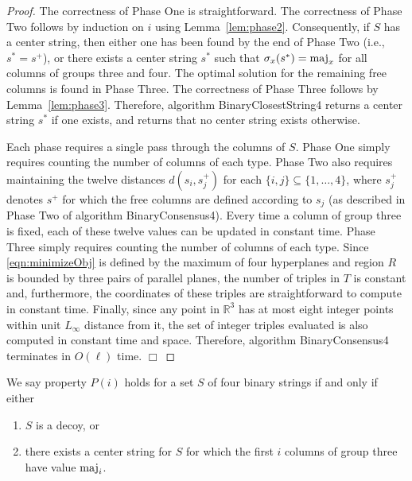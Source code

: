 \begin{proof}
The correctness of Phase One is straightforward.
The correctness of Phase Two follows by induction on $i$ 
using Lemma~\ref{lem:phase2}.
Consequently, if $S$ has a center string, then either one has been found 
by the end of Phase Two (i.e., $s^* = s^+$), 
or there exists a center string $s^*$ such that
$\sigma_x(s^*) = \operatorname{maj}_x$ for all columns of groups three and four.
The optimal solution for the remaining free columns is found in Phase Three.
The correctness of Phase Three follows by Lemma~\ref{lem:phase3}.
Therefore, algorithm {\sc BinaryClosestString4} returns a center string $s^*$
if one exists, and returns that no center string exists otherwise.

Each phase requires a single pass through the columns of $S$.
Phase One simply requires counting the number of columns of each type.
Phase Two also requires maintaining the twelve distances $d(s_i, s^+_j)$
for each $\{i, j\} \subseteq \{1, \ldots, 4\}$, 
where $s^+_j$ denotes $s^+$ for which the free columns are
defined according to $s_j$ 
(as described in Phase Two of algorithm {\sc BinaryConsensus4}).
Every time a column of group three is fixed,
each of these twelve values can be updated in constant time.
Phase Three simply requires counting the number of columns of each type.
Since \eqref{eqn:minimizeObj} 
is defined by the maximum of four hyperplanes and
region $R$ is bounded by three pairs of parallel planes,
the number of triples in $T$ is constant and, furthermore, the coordinates
of these triples are straightforward to compute in constant time.
Finally, since any point in $\mathbb{R}^3$ has at most eight integer points 
within unit $L_\infty$ distance from it, the set of integer triples evaluated
is also computed in constant time and space.
Therefore, algorithm {\sc BinaryConsensus4} terminates in $O(\ell)$ time.
\hfill $\Box$ \end{proof}

\begin{definition}
We say property $P(i)$ holds for a set $S$ of four binary strings 
if and only if either
\begin{enumerate}
\item $S$ is a decoy, or
\item there exists a center string for $S$ for which
the first $i$ columns of group three have value $\operatorname{maj}_i$.
\end{enumerate}
\end{definition}

